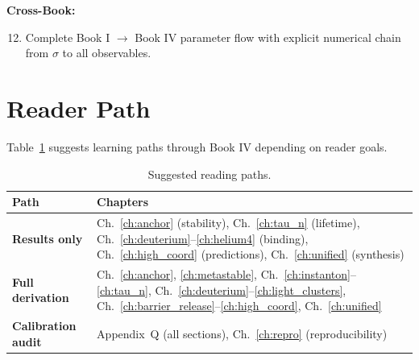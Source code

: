 \begin{edcopenbox}[title=Consolidated Open Problems]
\textbf{Cross-Book:}
\begin{enumerate}
    \setcounter{enumi}{11}
    \item Complete Book I $\to$ Book IV parameter flow with explicit
          numerical chain from $\sigma$ to all observables.
\end{enumerate}
\end{edcopenbox}

\section{Reader Path}
\label{sec:unified:path}

Table~\ref{tab:unified:path} suggests learning paths through Book IV
depending on reader goals.

\begin{table}[h]
\centering
\caption{Suggested reading paths.}
\label{tab:unified:path}
\begin{tabular}{lp{8cm}}
    \toprule
    Path & Chapters \\
    \midrule
    \textbf{Results only} &
    Ch.~\ref{ch:anchor} (stability),
    Ch.~\ref{ch:tau_n} (lifetime),
    Ch.~\ref{ch:deuterium}--\ref{ch:helium4} (binding),
    Ch.~\ref{ch:high_coord} (predictions),
    Ch.~\ref{ch:unified} (synthesis) \\
    \textbf{Full derivation} &
    Ch.~\ref{ch:anchor}, \ref{ch:metastable},
    Ch.~\ref{ch:instanton}--\ref{ch:tau_n},
    Ch.~\ref{ch:deuterium}--\ref{ch:light_clusters},
    Ch.~\ref{ch:barrier_release}--\ref{ch:high_coord},
    Ch.~\ref{ch:unified} \\
    \textbf{Calibration audit} &
    Appendix~Q (all sections),
    Ch.~\ref{ch:repro} (reproducibility) \\
    \bottomrule
\end{tabular}
\end{table}


